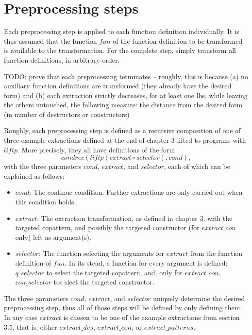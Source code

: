 \section{Preprocessing steps}

Each preprocessing step is applied to each function definition individually. It is thus assumed that the function $fun$ of the function definition to be transformed is available to the transformation. For the complete step, simply transform all function definitions, in arbitrary order.

TODO: prove that each preprocessing terminates -- roughly, this is because (a) no auxiliary function definitions are transformed (they already have the desired form) and (b) each extraction strictly decreases, for at least one lhs, while leaving the others untouched, the following measure: the distance from the desired form (in number of destructors or constructors)

Roughly, each preprocessing step is defined as a recursive composition of one of three example extractions defined at the end of chapter 3 lifted to programs with $liftp$. More precisely, they all have definitions of the form
\[
condrec(liftp(extract \circ selector), cond),
\]
with the three parameters $cond$, $extract$, and $selector$, each of which can be explained as follows:
\begin{itemize}
\item $cond$: The continue condition. Further extractions are only carried out when this condition holds.

\item $extract$: The extraction transformation, as defined in chapter 3, with the targeted copattern, and possibly the targeted constructor (for $extract\_con$ only) left as argument(s).

\item $selector$: The function selecting the arguments for $extract$ from the function definition of $fun$. In its stead, a function for every argument is defined: $q\_selector$ to select the targeted copattern, and, only for $extract\_con$, $con\_selector$ tos slect the targeted constructor.
\end{itemize}
The three parameters $cond$, $extract$, and $selector$ uniquely determine the desired preprocessing step, thus all of those steps will be defined by only defining them. In any case $extract$ is chosen to be one of the example extractions from section 3.5, that is, either $extract\_des$, $extract\_con$, or $extract\_patterns$.


